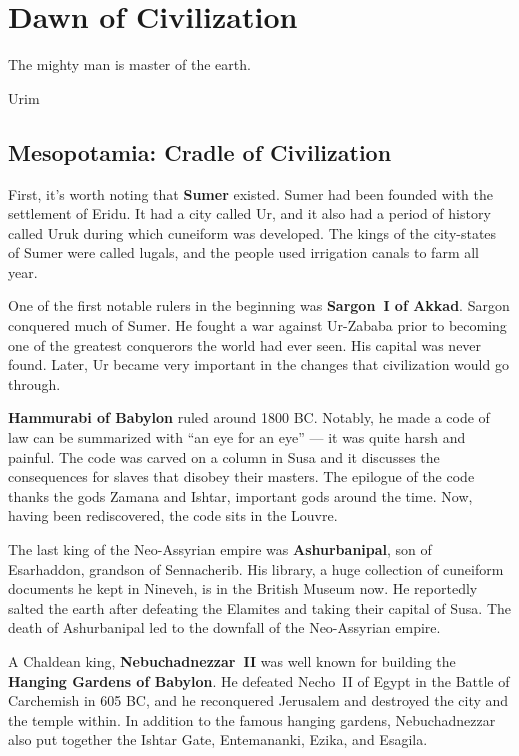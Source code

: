 \chapter{Dawn of Civilization}

\epigraph{%
  The mighty man is master of the earth.
}{Urim}

\section{Mesopotamia: Cradle of Civilization}

First, it's worth noting that \textbf{Sumer} existed.
Sumer had been founded with the settlement of Eridu.
It had a city called Ur,
and it also had a period of history called Uruk during which cuneiform was developed.
The kings of the city-states of Sumer were called lugals,
and the people used irrigation canals to farm all year.

One of the first notable rulers in the beginning was \textbf{Sargon~I of Akkad}.
Sargon conquered much of Sumer.
He fought a war against Ur-Zababa prior to becoming one of the greatest conquerors the world had ever seen.
His capital was never found.
Later, Ur became very important in the changes that civilization would go through.

\textbf{Hammurabi of Babylon} ruled around 1800 BC\@.
Notably, he made a code of law can be summarized with ``an eye for an eye'' --- it was quite harsh and painful.
The code was carved on a column in Susa and it discusses the consequences for slaves that disobey their masters.
The epilogue of the code thanks the gods Zamana and Ishtar, important gods around the time.
Now, having been rediscovered, the code sits in the Louvre.

The last king of the Neo-Assyrian empire was \textbf{Ashurbanipal}, son of Esarhaddon, grandson of Sennacherib.
His library, a huge collection of cuneiform documents he kept in Nineveh, is in the British Museum now.
He reportedly salted the earth after defeating the Elamites and taking their capital of Susa.
The death of Ashurbanipal led to the downfall of the Neo-Assyrian empire.

A Chaldean king, \textbf{Nebuchadnezzar~II} was well known for building the \textbf{Hanging Gardens of Babylon}.
He defeated Necho~II of Egypt in the Battle of Carchemish in 605 BC,
and he reconquered Jerusalem and destroyed the city and the temple within.
In addition to the famous hanging gardens, Nebuchadnezzar also put together the Ishtar Gate,
Entemananki, Ezika, and Esagila.

